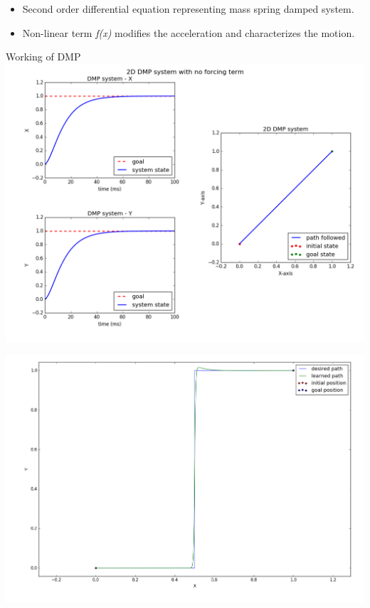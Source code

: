 \documentclass{beamer}
\begin{document}
	
	\begin{frame}
		\begin{itemize}
			\item Second order differential equation representing mass spring damped system. 
			\item Non-linear term \textit{f(x)} modifies the acceleration and characterizes the motion. 
		\end{itemize}
	\end{frame}

	\begin{frame}{Working of DMP}
		\includegraphics[width=\textwidth]{images/dmp_no_f}
	\end{frame}
	\begin{frame}
		\includegraphics[width=\textwidth]{images/step_f}
	\end{frame}
\end{document}
